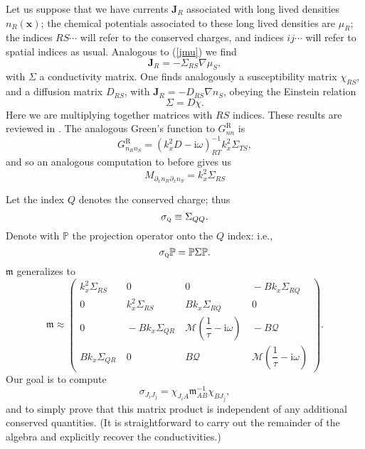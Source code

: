 \documentclass[10pt, oneside]{book}
\begin{document}
\begin{doublespace}
Let us suppose that we have currents $\mathbf{J}_R$ associated with long lived densities $n_R(\mathbf{x})$;  the chemical potentials associated to these long lived densities are $\mu_R$;  the indices $RS\cdots$ will refer to the conserved charges, and indices $ij\cdots$ will refer to spatial indices as usual.    Analogous to (\ref{jmu}) we find \begin{equation}
\mathbf{J}_R = -\Sigma_{RS}\nabla \mu_S,   \label{jsigmars}
\end{equation} with $\Sigma$ a conductivity matrix.  One finds analogously a susceptibility matrix $\chi_{RS}$, and a diffusion matrix $D_{RS}$, with $\mathbf{J}_R = -D_{RS}\nabla n_S$, obeying the Einstein relation \begin{equation}
\Sigma =  D \chi .
\end{equation}
Here we are multiplying together matrices with $RS$ indices.  These results are reviewed in \cite{Hartnoll:2014lpa}.  The analogous Green's function to $G^{\mathrm{R}}_{nn}$ is \begin{equation}
G^{\mathrm{R}}_{n_Rn_S} = \left(k_x^2 D-\mathrm{i}\omega\right)^{-1}_{RT}k_x^2 \Sigma_{TS},
\end{equation}and so an analogous computation to before gives us \begin{equation}
M_{\partial_x n_R \partial_x n_S} = k_x^2 \Sigma_{RS}
\end{equation}  

Let the index $Q$ denotes the conserved charge;  thus \begin{equation}
\sigma_{\textsc{q}} \equiv \Sigma_{QQ}.
\end{equation}Denote with $\mathbb{P}$ the projection operator onto the $Q$ index: i.e., \begin{equation}
\sigma_{\textsc{q}}\mathbb{P} = \mathbb{P}\Sigma\mathbb{P}.   \label{eqproj}
\end{equation}
$\mathfrak{m}$ generalizes to \begin{equation}
\mathfrak{m} \approx \left(\begin{array}{cccc} k_x^2\Sigma_{RS} &\ 0 &\ 0 &\ -Bk_x\Sigma_{RQ} \\ 0 &\ k_x^2\Sigma_{RS} &\ Bk_x\Sigma_{RQ} &\ 0 \\ 0 &\  -Bk_x\Sigma_{QR} &\ \mathcal{M}\left(\dfrac{1}{\tau}-\mathrm{i}\omega\right) &\ -B\mathcal{Q} \\  Bk_x\Sigma_{QR}  &\ 0 &\ B\mathcal{Q} &\  \mathcal{M}\left(\dfrac{1}{\tau}-\mathrm{i}\omega\right) \end{array}\right).    \label{mmfinal}
\end{equation}
Our goal is to compute \begin{equation}
\sigma_{J_iJ_j} = \chi_{J_i A} \mathfrak{m}^{-1}_{AB}\chi_{BJ_j},   \label{sigmadef2}
\end{equation}and to simply prove that this matrix product is independent of any additional conserved quantities.   (It is straightforward to carry out the remainder of the algebra and explicitly recover the conductivities.)   


\end{doublespace}
\end{document}
